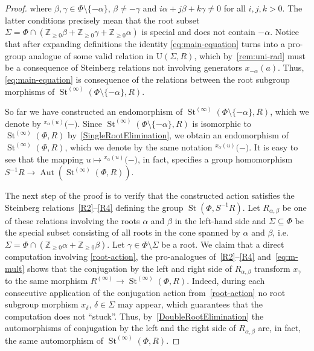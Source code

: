 \documentclass[oneside, 11pt]{amsart}
\numberwithin{equation}{section}
\theoremstyle{definition}
\theoremstyle{remark}
\DeclareMathOperator\St{St}
\DeclareMathOperator\Aut{Aut}
\newcommand{\ZZ}{\mathbb{Z}}
\newcommand{\up}[2]{{^{#1}\!{#2}}}
\begin{document}
\begin{proof}
 where \(\beta, \gamma \in \Phi \setminus \{- \alpha\}\), $\beta \neq -\gamma$ and \(i\alpha + j\beta + k\gamma \neq 0\) for all \(i, j, k > 0\). The latter conditions precisely mean that the root subset $\Sigma = \Phi\cap (\ZZ_{\geq 0}\beta + \ZZ_{\geq 0}\gamma + \ZZ_{\geq 0}\alpha)$ is special and does not contain $-\alpha$. 
 Notice that after expanding definitions the identity \eqref{eq:main-equation} turns into a pro-group analogue of some valid relation in $\mathrm{U}(\Sigma, R)$, which by~\cref{rem:uni-rad} must be a consequence of Steinberg relations not involving generators $x_{-\alpha}(a)$. Thus, \eqref{eq:main-equation} is consequence of the relations between the root subgroup morphisms of $\St^{(\infty)}(\Phi\setminus\{-\alpha\}, R)$.
 
 So far we have constructed an endomorphism of $\St^{(\infty)}(\Phi\setminus\{-\alpha\}, R)$, which we denote by $\up{x_\alpha(u)}(-)$.
 Since $\St^{(\infty)}(\Phi\setminus\{-\alpha\}, R)$ is isomorphic to $\St^{(\infty)}(\Phi, R)$ by~\cref{SingleRootElimination}, we obtain an endomorphism of $\St^{(\infty)}(\Phi, R)$, which we denote by the same notation $\up{x_\alpha(u)}(-)$. It is easy to see that the mapping $u \mapsto \up{x_\alpha(u)}(-)$, in fact, specifies a group homomorphism $S^{-1}R \to \Aut(\St^{(\infty)}(\Phi, R))$. 
 
 The next step of the proof is to verify that the constructed action satisfies the Steinberg relations~\eqref{R2}--\eqref{R4} defining the group $\St(\Phi, S^{-1}R)$.
 Let $R_{\alpha, \beta}$ be one of these relations involving the roots $\alpha$ and $\beta$ in the left-hand side and $\Sigma \subseteq \Phi$ be the special subset consisting of all roots in the cone spanned by $\alpha$ and $\beta$, i.e. $\Sigma = \Phi \cap (\ZZ_{\geq 0} \alpha + \ZZ_{\geq 0} \beta)$. Let $\gamma \in \Phi \setminus \Sigma$ be a root. We claim that a direct computation involving \cref{root-action}, the pro-analogues of~\eqref{R2}--\eqref{R4} and~\eqref{eq:m-mult} shows that the conjugation by the left and right side of $R_{\alpha, \beta}$ transform $x_\gamma$ to the same morphism $R^{(\infty)} \to \St^{(\infty)}(\Phi, R)$.
 Indeed, during each consecutive application of the conjugation action from~\cref{root-action} no root subgroup morphism $x_\delta$, $\delta \in \Sigma$ may appear, which guarantees that the computation does not ``stuck''. Thus, by~\cref{DoubleRootElimination} the automorphisms of conjugation by the left and the right side of $R_{\alpha,\beta}$ are, in fact, the same automorphism of $\St^{(\infty)}(\Phi, R)$.


\end{proof}
\end{document}
